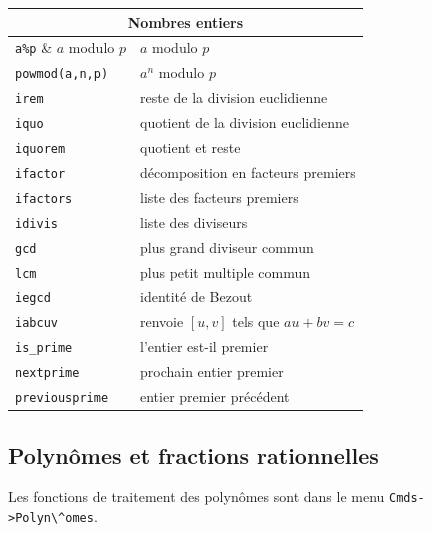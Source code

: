 \documentclass{article}
\begin{document}
\begin{giacjshere}
\begin{center}
\begin{tabular}{|ll|}
\hline
\multicolumn{2}{|c|}{\bf Nombres entiers}\\
\hline\hline
\verb|a%p| & $a$ modulo $p$\\
\verb|powmod(a,n,p)| & $a^n$ modulo $p$\\
\verb|irem| &reste de la division euclidienne\\
\verb|iquo| &quotient de la division euclidienne\\
\verb|iquorem| &quotient et reste\\
\hline
\verb|ifactor| & d\'ecomposition en facteurs premiers\\
\verb|ifactors| & liste des facteurs premiers\\
\verb|idivis| & liste des diviseurs\\
\hline
\verb|gcd| & plus grand diviseur commun\\
\verb|lcm| & plus petit multiple commun\\
\verb|iegcd| & identit\'e de Bezout\\
\verb|iabcuv| & renvoie $[u,v]$ tels que $au+bv=c$\\
\hline
\verb|is_prime| & l'entier est-il premier\\
\verb|nextprime| & prochain entier premier\\
\verb|previousprime| & entier premier pr\'ec\'edent\\
\hline
\end{tabular}
\end{center}
%
\subsection{Polyn\^omes et fractions rationnelles}
%
Les fonctions de traitement des polyn\^omes sont dans le menu 
\verb|Cmds->Polyn\^omes|. 


\end{giacjshere}
\end{document}
